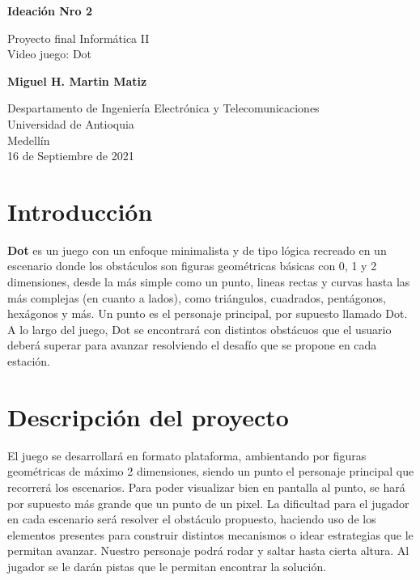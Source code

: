 \documentclass{article}
\begin{document}
\begin{titlepage}
    \begin{center}
        \vspace*{1cm}
            
        \Huge
        \textbf{Ideación Nro 2}
            
        \vspace{0.5cm}
        \LARGE
        Proyecto final Informática II \\
        Video juego: Dot
            
        \vspace{1.5cm}
            
        \textbf{Miguel H. Martin Matiz}
            
        \vfill
            
        \vspace{0.8cm}
            
        \Large
        Despartamento de Ingeniería Electrónica y Telecomunicaciones\\
        Universidad de Antioquia\\
        Medellín\\
        16 de Septiembre de 2021
            
    \end{center}
\end{titlepage}

\tableofcontents
\newpage
\section{Introducción}\label{intro}

\textbf{Dot} es un juego con un enfoque minimalista y de tipo lógica recreado en un escenario donde los obstáculos son figuras geométricas básicas con 0, 1 y 2 dimensiones, desde la más simple como un punto, lineas rectas y curvas hasta las más complejas (en cuanto a lados), como triángulos, cuadrados, pentágonos, hexágonos y más. Un punto es el personaje principal, por supuesto llamado Dot. A lo largo del juego, Dot se encontrará con distintos obstácuos que el usuario deberá superar para avanzar resolviendo el desafío que se propone en cada estación.
\\
\section{Descripción del proyecto} \label{imagenes}
El juego se desarrollará en formato plataforma, ambientando por figuras geométricas de máximo 2 dimensiones, siendo un punto el personaje principal que recorrerá los escenarios. Para poder visualizar bien en pantalla al punto, se hará por supuesto más grande que un punto de un pixel. La dificultad para el jugador en cada escenario será resolver el obstáculo propuesto, haciendo uso de los elementos presentes para construir distintos mecanismos o idear estrategias que le permitan avanzar. Nuestro personaje podrá rodar y saltar hasta cierta altura. Al jugador se le darán pistas que le permitan encontrar la solución.
\end{document}
